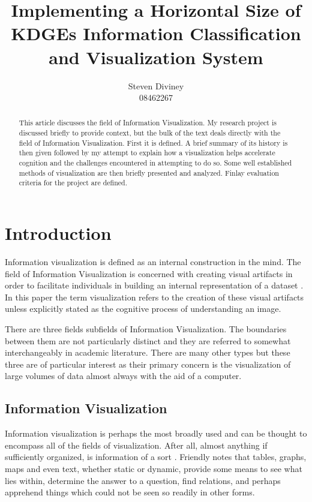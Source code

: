 \documentclass[a4paper, 10pt, titlepage, twocolumn, onehalfspace]{article}
\begin{document}
\title{Implementing a Horizontal Size of KDGEs Information Classification and Visualization System}
\author{Steven Diviney \\
08462267
}


\maketitle

\newpage

\begin{abstract}
This article discusses the field of Information Visualization. My research project is discussed briefly to provide context, but the bulk of the text deals directly with the field of Information Visualization. First it is defined. A brief summary of its history is then given followed by my attempt to explain how a visualization helps accelerate cognition and the challenges encountered in attempting to do so. Some well established methods of visualization are then briefly presented and analyzed. Finlay evaluation criteria for the project are defined. 
\end{abstract}

\section{Introduction}
Information visualization is defined as an internal construction in the mind. The field of Information Visualization is concerned with creating visual artifacts in order to facilitate individuals in building an internal representation of a dataset \cite{spence2001information}. In this paper the term visualization refers to the creation of these visual artifacts unless explicitly stated as the cognitive process of understanding an image.

There are three fields subfields of Information Visualization. The boundaries between them are not particularly distinct and they are referred to somewhat interchangeably in academic literature. There are many other types but these three are of particular interest as their primary concern is the visualization of large volumes of data almost always with the aid of a computer.
\subsection{Information Visualization}
Information visualization is perhaps the most broadly used and can be thought to encompass all of the fields of visualization. After all, almost anything if sufficiently organized, is information of a sort \cite{friendly2001milestones}. Friendly notes that tables, graphs, maps and even text, whether static or dynamic, provide some means to see what lies within, determine the answer to a question, find relations, and perhaps apprehend things which could not be seen so readily in other forms. 
\end{document}
